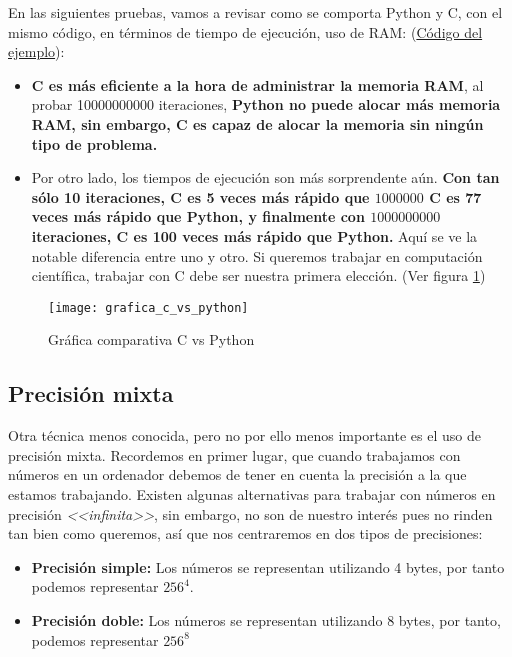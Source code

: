 En las siguientes pruebas, vamos a revisar como se comporta Python y C, con el mismo código, en términos de tiempo de ejecución, uso de RAM: (\hyperref[prueba:cvspython]{Código del ejemplo}):

\begin{itemize}
	\item \textbf{C es más eficiente a la hora de administrar la memoria RAM}, al probar 10000000000 iteraciones, \textbf{Python no puede alocar más memoria RAM, sin embargo, C es capaz de alocar la memoria sin ningún tipo de problema.}
	
	\item Por otro lado, los tiempos de ejecución son más sorprendente aún. \textbf{Con tan sólo 10 iteraciones, C es 5 veces más rápido que $1000000$ C es 77 veces más rápido que Python, y finalmente con $1000000000$ iteraciones, C es 100 veces más rápido que Python.} Aquí se ve la notable diferencia entre uno y otro. Si queremos trabajar en computación científica, trabajar con C debe ser nuestra primera elección. (Ver figura \ref{fig:cvspython})
\end{itemize}

\begin{figure}[h]
	\texttt{[image: grafica\_c\_vs\_python]}
	\centering
	\caption{Gráfica comparativa C vs Python}
	\label{fig:cvspython}
\end{figure}

\subsection{Precisión mixta}
Otra técnica menos conocida, pero no por ello menos importante es el uso de precisión mixta. Recordemos en primer lugar, que cuando trabajamos con números en un ordenador debemos de tener en cuenta la precisión a la que estamos trabajando. Existen algunas alternativas para trabajar con números en precisión \textit{<<infinita>>}, sin embargo, no son de nuestro interés pues no rinden tan bien como queremos, así que nos centraremos en dos tipos de precisiones:

\begin{itemize}
	\item \textbf{Precisión simple: } Los números se representan utilizando 4 bytes, por tanto podemos representar $256^4$.
	
	\item \textbf{Precisión doble: } Los números se representan utilizando 8 bytes, por tanto, podemos representar $256^8$
\end{itemize}

